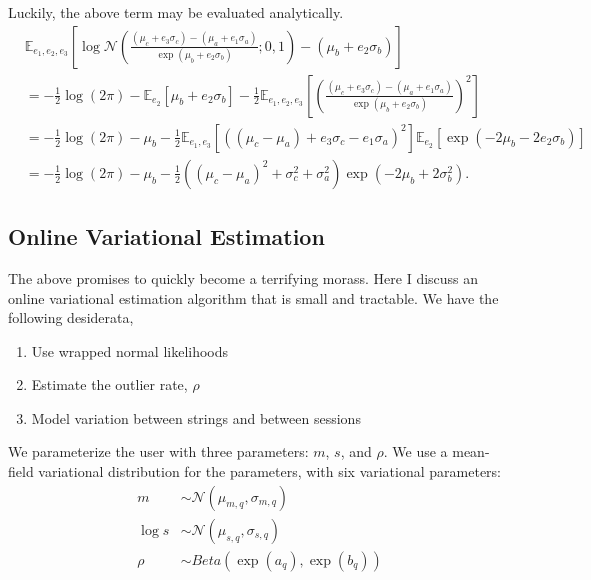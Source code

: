 Luckily, the above term may be evaluated analytically.
\begin{align}
    &\mathbb{E}_{e_1,e_2,e_3} \left[
        \log \mathcal{N}\left(
            \frac{(\mu_c + e_3 \sigma_c) - (\mu_a + e_1 \sigma_a)}
            {\exp(\mu_b + e_2 \sigma_b)} ; 0, 1
        \right)
        - (\mu_b + e_2 \sigma_b)
    \right] \\
    &= -\frac{1}{2}\log(2\pi)
    - \mathbb{E}_{e_2}[\mu_b + e_2 \sigma_b]
    - \frac{1}{2}
    \mathbb{E}_{e_1,e_2,e_3} \left[
        \left(
            \frac{(\mu_c + e_3 \sigma_c) - (\mu_a + e_1 \sigma_a)}
            {\exp(\mu_b + e_2 \sigma_b)}
        \right)^2
    \right] \\
    &= -\frac{1}{2}\log(2\pi)
    - \mu_b
    - \frac{1}{2}
    \mathbb{E}_{e_1,e_3} \left[
        \left(
            (\mu_c - \mu_a) + e_3 \sigma_c - e_1 \sigma_a
        \right)^2
    \right]
    \mathbb{E}_{e_2} \left[
        \exp(-2\mu_b - 2 e_2 \sigma_b)
    \right] \\
    &= -\frac{1}{2}\log(2\pi)
    - \mu_b
    - \frac{1}{2}
    \left(
        (\mu_c - \mu_a)^2 + \sigma_c^2 + \sigma_a^2
    \right)
    \exp(-2\mu_b + 2\sigma_b^2).
\end{align}


\subsection{Online Variational Estimation}
The above promises to quickly become a terrifying morass.
Here I discuss an online variational estimation algorithm
that is small and tractable.
We have the following desiderata,
\begin{enumerate}
    \item Use wrapped normal likelihoods
    \item Estimate the outlier rate, $\rho$
    \item Model variation between strings and between sessions
\end{enumerate}

We parameterize the user with three parameters:
$m$, $s$, and $\rho$.
We use a mean-field variational distribution for the parameters,
with six variational parameters:
\begin{align*}
    m &\sim \mathcal{N}(\mu_{m,q}, \sigma_{m,q}) \\
    \log s &\sim \mathcal{N}(\mu_{s,q}, \sigma_{s,q}) \\
    \rho &\sim Beta(\exp(a_q), \exp(b_q))
\end{align*}

